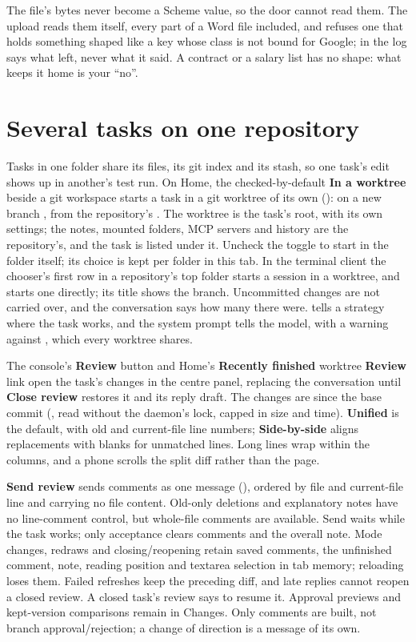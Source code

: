 \begin{careful}
The file's bytes never become a Scheme value, so the door cannot read them.
The upload reads them itself, every part of a Word file included, and
refuses one that holds something shaped like a key whose class is not bound
for Google;  in the log says what left, never what it
said. A contract or a salary list has no shape: what keeps it home is your
``no''.
\end{careful}

\section{Several tasks on one repository}

Tasks in one folder share its files, its git index and its stash, so one
task's edit shows up in another's test run. On Home, the checked-by-default
\textbf{In a worktree} beside a git workspace starts a task in a git worktree
of its own ():  on a new branch
, from the repository's . The worktree is the
task's root, with its own  settings; the notes, mounted
folders, MCP servers and history are the repository's, and the task is
listed under it. Uncheck the toggle to start in the folder itself; its
choice is kept per folder in this tab. In the terminal client the chooser's
first row in a repository's top folder starts a session in a worktree, and
 starts one directly; its title shows the
branch.
Uncommitted changes are not carried over, and the conversation says how
many there were.  tells a strategy where the task works,
and the system prompt tells the model, with a warning against
, which every worktree shares.

The console's \textbf{Review} button and Home's \textbf{Recently finished}
worktree \textbf{Review} link open the task's changes in the centre panel,
replacing the conversation until \textbf{Close review} restores it and its
reply draft. The changes are since the base commit (,
read without the daemon's lock, capped in size and time). \textbf{Unified}
is the default, with old and current-file line numbers; \textbf{Side-by-side}
aligns replacements with blanks for unmatched lines. Long lines wrap within
the columns, and a phone scrolls the split diff rather than the page.

\textbf{Send review} sends comments as one message (),
ordered by file and current-file line and carrying no file content. Old-only
deletions and explanatory notes have no line-comment control, but whole-file
comments are available. Send waits while the task works; only acceptance
clears comments and the overall note. Mode changes, redraws and closing/reopening
retain saved comments, the unfinished comment, note, reading position and
textarea selection in tab memory; reloading loses them. Failed refreshes keep
the preceding diff, and late replies cannot reopen a closed review. A closed
task's review says to resume it. Approval previews and kept-version comparisons
remain in Changes. Only comments are built, not branch approval/rejection;
a change of direction is a message of its own.

